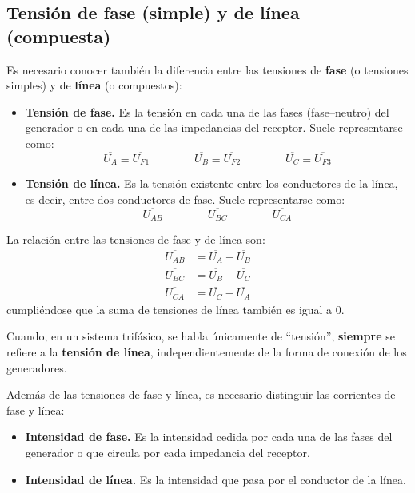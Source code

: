\documentclass[11pt]{book} %
\begin{document}
	\subsection{Tensión de fase (simple) y de línea (compuesta)}\label{sec.fase_linea}
	Es necesario conocer también la diferencia entre las tensiones de \textbf{fase} (o tensiones simples) y de \textbf{línea} (o compuestos):
	\begin{itemize}
		\item \textbf{Tensión de fase.} Es la tensión en cada una de las fases (fase--neutro) del generador o en cada una de las impedancias del receptor. Suele representarse como: 
		\begin{equation*}
			\overline{U_A}\equiv \overline{U_{F1}} \qquad \qquad \overline{U_B}\equiv \overline{U_{F2}} \qquad \qquad \overline{U_C} \equiv \overline{U_{F3}} 
		\end{equation*}
		\item \textbf{Tensión de línea.} Es la tensión existente entre los conductores de la línea, es decir, entre dos conductores de fase. Suele representarse como: 
		\begin{equation*}
			\overline{U_{AB}} \qquad \qquad \overline{U_{BC}} \qquad \qquad \overline{U_{CA}} 
		\end{equation*}
	\end{itemize}
	La relación entre las tensiones de fase y de línea son: 
	\begin{align}\label{eq.tensionFL}
		\overline{U_{AB}} &= \overline{U_A} - \overline{U_B}\\
		\overline{U_{BC}} &= \overline{U_B} - \overline{U_C}\\
		\overline{U_{CA}} &= \overline{U_C} - \overline{U_A}
	\end{align}
	cumpliéndose que la suma de tensiones de línea también es igual a 0. 
	\begin{remark}
	    Cuando, en un sistema trifásico, se habla únicamente de ``tensión'', \textbf{siempre} se refiere a la \textbf{tensión de línea}, independientemente de la forma de conexión de los generadores.
	\end{remark}
	
	Además de las tensiones de fase y línea, es necesario distinguir las corrientes de fase y línea:
	\begin{itemize}
		\item \textbf{Intensidad de fase.} Es la intensidad cedida por cada una de las fases del generador o que circula por cada impedancia del receptor. 
		\item \textbf{Intensidad de línea.} Es la intensidad que pasa por el conductor de la línea. 
	\end{itemize}
	
\end{document}
